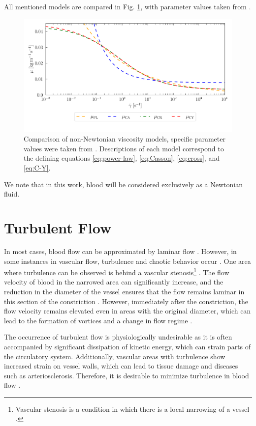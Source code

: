 All mentioned models are compared in Fig. \ref{fig:vs}, with parameter values taken from \cite{Eichler2023}.
\begin{figure}[H]
	\centering
	\includegraphics[width=1.0\textwidth]{figures/modely.pdf}
	\vspace{-9mm}
	\caption{Comparison of non-Newtonian viscosity models, specific parameter values were taken from \cite{Eichler2023}. Descriptions of each model correspond to the defining equations
		\eqref{eq:power-law}, \eqref{eq:Casson}, \eqref{eq:cross}, and \eqref{eq:C-Y}.}
	\label{fig:vs}
\end{figure}
We note that in this work, blood will be considered exclusively as a Newtonian fluid.

\section*{\fontsize{11}{15}\selectfont Turbulent Flow}
In most cases, blood flow can be approximated by laminar flow \cite{Sequeira}. However, in some instances in vascular flow, turbulence and chaotic behavior occur \cite{Saqr2020}. One area where turbulence can be observed is behind a vascular stenosis\footnote{Vascular stenosis is a condition in which there is a local narrowing of a vessel \cite{Carabello2009}.} \cite{Jain2022}. The flow velocity of blood in the narrowed area can significantly increase, and the reduction in the diameter of the vessel ensures that the flow remains laminar in this section of the constriction \cite{Sequeira}. However, immediately after the constriction, the flow velocity remains elevated even in areas with the original diameter, which can lead to the formation of vortices and a change in flow regime \cite{Saloner2019, Varghese2003}.

The occurrence of turbulent flow is physiologically undesirable as it is often accompanied by significant dissipation of kinetic energy, which can strain parts of the circulatory system. Additionally, vascular areas with turbulence show increased strain on vessel walls, which can lead to tissue damage and diseases such as arteriosclerosis. Therefore, it is desirable to minimize turbulence in blood flow \cite{Saloner2019, Kameneva2004}.
